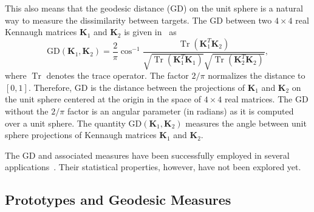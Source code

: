 \documentclass[journal]{IEEEtran}
\DeclareMathOperator{\Tr}{Tr}
\begin{document}
	
	This also means that the geodesic distance ($\text{GD}$) on the unit sphere is a natural way to measure the dissimilarity between targets. The $\text{GD}$ between two $4 \times 4$ real Kennaugh matrices $\bm{K}_1$ and $\bm{K}_2$ is given in~\cite{APolSARScatteringPowerFactorizationFrameworkandNovelRollInvariantParametersBasedUnsupervisedClassificationSchemeUsingaGeodesicDistanceinpress} as
	\begin{equation}
	\text{GD}(\bm{K}_1,\bm{K}_2) =  \frac{2}{\pi} \cos^{-1}\frac{\Tr(\bm{K}_1^T\bm{K}_2)}{\sqrt{\Tr(\bm{K}_1^T\bm{K}_1)}\sqrt{\Tr(\bm{K}_2^T\bm{K}_2)}} ,
	\label{eq:GD_Ken}
	\end{equation}
	where $\Tr$ denotes the trace operator. 
	The factor $2/\pi$ normalizes the distance to $[0,1]$. 
	Therefore, $\text{GD}$ is the distance between the projections of $\bm{K}_1$ and $\bm{K}_2$ on the unit sphere centered at the origin in the space of $4 \times 4$ real matrices. 
	The $\text{GD}$ without the $2/\pi$ factor is an angular parameter (in radians) as it is computed over a unit sphere. 
	The quantity $\text{GD}(\bm{K}_1, \bm{K}_2)$ measures the angle between unit sphere projections of Kennaugh matrices $\bm{K}_1$ and  $\bm{K}_2$.
	
	The GD and associated measures have been successfully employed in several applications~\cite{ClassificationPolSARGeodesic,AGeneralizedVolumeScatteringModelBasedVegetationIndexfromPolarimetricSARData2019,NovelTechniquesforBuiltupAreaExtractionfromPolarimetricSARImages2019,APolSARScatteringPowerFactorizationFrameworkandNovelRollInvariantParametersBasedUnsupervisedClassificationSchemeUsingaGeodesicDistanceinpress,ChangeDetectionPolSARGeodesicDistanceBetweenScatteringMechanisms,ARadarVegetationIndexforCropMonitoringUsingCompactPolarimetricSARData}. Their statistical properties, however, have not been explored yet.%
	\subsection{Prototypes and Geodesic Measures}
	
\end{document}
